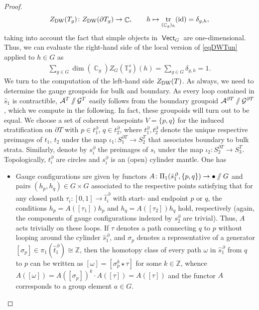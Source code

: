 \documentclass[10pt,a4paper]{amsart}
\DeclareMathOperator{\id}{id}
\DeclareMathOperator{\tr}{tr}
\DeclareMathOperator{\vect}{\mathsf{Vect}}
\DeclareMathOperator{\C}{\mathbb{C}}
\newcommand{\sslash}{\mathbin{/\mkern-6mu/}}
\numberwithin{equation}{section}
\theoremstyle{definition}
\begin{document}
\begin{proof}
 \begin{align*}
 Z_{\rm DW}(T_g)\colon Z_{\rm DW}(\partial T_g) \rightarrow \C , \qquad h \mapsto \tr_{(\C_g)_h}(\id) = \delta_{g,h},
 \end{align*}
 taking into account the fact that simple objects in $\vect_G$ are one-dimensional. Thus, we can evaluate the right-hand side of the local version of \eqref{eqDWTun} applied to $h \in G$ as
 \begin{align}
 \label{eqSoS}
 \sum_{g \in G} \dim (\C_g)Z_G(\mathbb{T}_g^s)(h) = \sum_{g \in G} \delta_{g,h} = 1.
 \end{align}
 We turn to the computation of the left-hand side $Z_{\rm DW}(T)$. As always, we need to determine the gauge groupoids for bulk and boundary. As every loop contained in $\hat{s}_1$ is contractible, $\mathcal{A}^T \sslash \mathcal{G}^T$ easily follows from the boundary groupoid $\mathcal{A}^{\partial T} \sslash \mathcal{G}^{\partial T}$, which we compute in the following. In fact, these groupoids will turn out to be equal. We choose a set of coherent basepoints $V = \{p, q\}$ for the induced stratification on $\partial T$ with $p \in t_1^{\partial}$, $q \in t_2^{\partial}$, where $t_1^{\partial}, t_2^{\partial}$ denote the unique respective preimages of $t_1$, $t_2$ under the map $\iota_1\colon S_1^{\partial T} \rightarrow S_2^T$ that associates boundary to bulk strata. Similarly, denote by $s_i^{\partial}$ the preimages of $s_i$ under the map $\iota_2\colon S_2^{\partial T} \rightarrow S_3^T$. Topologically, $t_i^{\partial}$ are circles and $s_i^{\partial}$ is an (open) cylinder mantle. One has
 \begin{itemize}\itemsep=0pt
 \item Gauge configurations are given by functors $A\colon \Pi_1(\hat{s}_1^{\, \partial}, \{p,q\}) \rightarrow \bullet \sslash G$ and pairs $(h_p, h_q) \in G \times G$ associated to the respective points satisfying that for any closed path $\tau_i\colon [0,1] \rightarrow \hat{t}_i^{ \, \partial}$ with start- and endpoint $p$ or $q$, the conditions $h_p = A([\tau_1])h_p$ and $h_q = A([\tau_2])h_q$ hold, respectively (again, the components of gauge configurations indexed by $s_2^{\partial}$ are trivial). Thus, $A$ acts trivially on these loops. If $\tau$ denotes a path connecting $q$ to $p$ without looping around the cylinder $\hat{s}_1^{\, \partial}$, and $\sigma_p$ denotes a representative of a generator $[\sigma_p] \in \pi_1(\hat{t}_1^{\, \partial}) \cong \mathbb{Z}$, then the homotopy class of every path $\omega$ in $\hat{s}_1^{\, \partial}$ from $q$ to $p$ can be written as $[\omega] = [\sigma_p^k \star \tau]$ for some $k \in \mathbb{Z}$, whence $A([\omega]) = A([\sigma_p])^k \cdot A([\tau]) = A([\tau])$ and the functor $A$ corresponds to a group element $a \in G$.

\end{itemize}
\end{proof}
\end{document}
